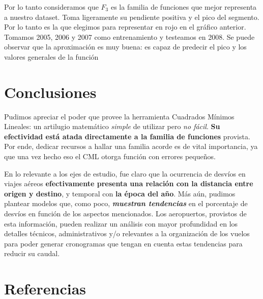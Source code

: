 \documentclass{endm}
\begin{document}
Por lo tanto consideramos que $F_3$ es la familia de funciones que mejor representa a nuestro dataset. Toma ligeramente su pendiente positiva y el pico del segmento. Por lo tanto es la que elegimos para representar en rojo en el gr\'afico anterior. Tomamos 2005, 2006 y 2007 como entrenamiento y testeamos en 2008. Se puede observar que la aproximaci\'on es muy buena: es capaz de predecir el pico y los valores generales de la funci\'on

\section{Conclusiones}

Pudimos apreciar el poder que provee la herramienta Cuadrados M\'inimos Lineales: un artilugio matem\'atico \textit{simple} de utilizar pero \textit{no f\'acil}. \textbf{Su efectividad est\'a atada directamente a la familia de funciones} provista. Por ende, dedicar recursos a hallar una familia acorde es de vital importancia, ya que una vez hecho eso el CML otorga funci\'on con errores peque\~nos. 

En lo relevante a los ejes de estudio, fue claro que la ocurrencia de desv\'ios en viajes a\'ereos \textbf{efectivamente presenta una relaci\'on con la distancia entre origen y destino}, y temporal con \textbf{la \'epoca del a\~no}. M\'as a\'un, pudimos plantear modelos que, como poco, \textit{\textbf{muestran tendencias}} en el porcentaje de desv\'ios en funci\'on de los aspectos mencionados. Los aeropuertos, provistos de esta informaci\'on, pueden realizar un an\'alisis con mayor profundidad en los detalles t\'ecnicos, administrativos y/o relevantes a la organizaci\'on de los vuelos para poder generar cronogramas que tengan en cuenta estas tendencias para reducir su caudal.

\section{Referencias}



\end{document}
